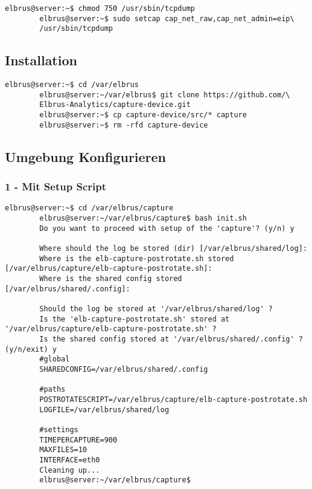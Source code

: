 \documentclass{article}
\begin{document}
	\begin{lstlisting}[caption={Ändern der Berechtigungen auf 'tcpdump'.}]
		elbrus@server:~$ chmod 750 /usr/sbin/tcpdump
		elbrus@server:~$ sudo setcap cap_net_raw,cap_net_admin=eip\
		/usr/sbin/tcpdump
	\end{lstlisting}
	
	\subsection{Installation}
	\begin{lstlisting}[caption={Clonen der Software von GitHub.}]
		elbrus@server:~$ cd /var/elbrus
		elbrus@server:~/var/elbrus$ git clone https://github.com/\
		Elbrus-Analytics/capture-device.git
		elbrus@server:~$ cp capture-device/src/* capture
		elbrus@server:~$ rm -rfd capture-device
	\end{lstlisting}
	
	\newpage
	\subsection[file config]{Umgebung Konfigurieren}
	\subsubsection{1 - Mit Setup Script}
	\begin{lstlisting}[caption={Ausführen des setup Scripts}, breaklines=true,]
		elbrus@server:~$ cd /var/elbrus/capture
		elbrus@server:~/var/elbrus/capture$ bash init.sh
		Do you want to proceed with setup of the 'capture'? (y/n) y
		
		Where should the log be stored (dir) [/var/elbrus/shared/log]:
		Where is the elb-capture-postrotate.sh stored [/var/elbrus/capture/elb-capture-postrotate.sh]:
		Where is the shared config stored [/var/elbrus/shared/.config]:
		
		Should the log be stored at '/var/elbrus/shared/log' ?
		Is the 'elb-capture-postrotate.sh' stored at '/var/elbrus/capture/elb-capture-postrotate.sh' ?
		Is the shared config stored at '/var/elbrus/shared/.config' ? (y/n/exit) y
		#global
		SHAREDCONFIG=/var/elbrus/shared/.config
		
		#paths
		POSTROTATESCRIPT=/var/elbrus/capture/elb-capture-postrotate.sh
		LOGFILE=/var/elbrus/shared/log
		
		#settings
		TIMEPERCAPTURE=900
		MAXFILES=10
		INTERFACE=eth0
		Cleaning up...
		elbrus@server:~/var/elbrus/capture$
	\end{lstlisting}
	
\end{document}
